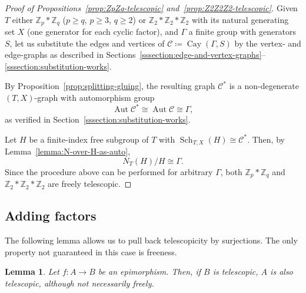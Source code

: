 \documentclass[10pt,a4paper]{amsart}
\newtheorem{lemm}[theo]{Lemma}
\theoremstyle{definition}
\newcommand{\ZZ}{\mathbb{Z}}
\newcommand{\cC}{\mathcal{C}}
\DeclareMathOperator{\Sch}{Sch}
\DeclareMathOperator{\Cay}{Cay}
\DeclareMathOperator{\aut}{Aut}
\begin{document}
\begin{proof}[Proof of Propositions~\ref{prop:ZpZq-telescopic} and~\ref{prop:Z2Z2Z2-telescopic}] Given $T$ either $\ZZ_p*\ZZ_q$ ($p \geq q$, $p\geq 3$, $q\geq 2$) or $\ZZ_2*\ZZ_2*\ZZ_2$ with its natural generating set $X$ (one generator for each cyclic factor), and ${\Gamma}$ a finite group with generators $S$, let us substitute the edges and vertices of $\cC \coloneqq \Cay({\Gamma},S)$ by the vertex- and edge-graphs as described in Sections~\ref{sssection:edge-and-vertex-graphs}--\ref{sssection:substitution-works}. 

By Proposition~\ref{prop:splitting-gluing}, the resulting graph $\cC^*$ is a non-degenerate $(T,X)$-graph with automorphism group
\[
\aut \cC^* \cong \aut \cC \cong {\Gamma},
\]
as verified in Section~\ref{sssection:substitution-works}. 
 
Let $H$ be a finite-index free subgroup of $T$ with $\Sch_{T,X}(H) \cong \cC^*$. Then, by Lemma~\ref{lemma:N-over-H-as-auto},
\[
N_T(H)/H \cong \Gamma.
\]
Since the procedure above can be performed for arbitrary ${\Gamma}$, both $\ZZ_p*\ZZ_q$ and $\ZZ_2*\ZZ_2*\ZZ_2$ are freely telescopic.
\end{proof}


\subsection{Adding factors}\label{section:addingfactors}


The following lemma allows us to pull back telescopicity by surjections. The only property not guaranteed in this case is freeness.

\begin{lemm}\label{lemma:surjection-telescopic}
Let $ f : A \longrightarrow B$ be an epimorphism. Then, if $B$ is telescopic, $A$ is also telescopic, although not necessarily freely.
\end{lemm}
\end{document}
